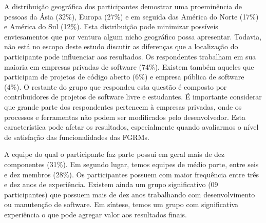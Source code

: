 A distribuição geográfica dos participantes demostrar uma proeminência de
pessoas da Ásia (32\%), Europa (27\%) e em seguida das América do Norte (17\%) e
América do Sul (12\%). Esta distribuição pode minimizar possíveis enviesamentos
que por ventura algum nicho geográfico possa apresentar. Todavia, não está no
escopo deste estudo discutir as diferenças que a localização do participante
pode influenciar aos resultados. Os respondentes trabalham em sua maioria em
empresas privadas de software (74\%). Existem também aqueles que participam de
projetos de código aberto (6\%) e empresa pública de software (4\%). O restante
do grupo que respondeu esta questão é composto por contribuidores de projetos de
software livre e estudantes. É importante considerar que grande parte dos
respondentes pertencem à empresas privadas, onde os processos e ferramentas não
podem ser modificados pelo desenvolvedor. Esta característica pode afetar os
resultados, especialmente quando avaliarmos o nível de satisfação das
funcionalidades das FGRMs.




A equipe do qual o participante faz parte possui em geral mais de dez
componentes (31\%). Em segundo lugar, temos equipes de médio porte, entre seis e
dez membros (28\%). Os participantes possuem com maior frequência entre três e
dez anos de experiência. Existem ainda um grupo significativo (09 participantes)
que possuem mais de dez anos trabalhando com desenvolvimento ou manutenção de
software. Em síntese, temos um grupo com significativa experiência o que pode
agregar valor aos resultados finais.


